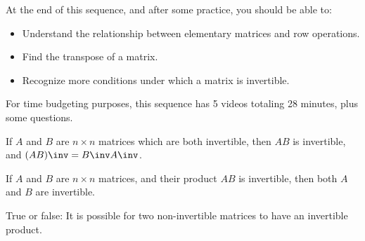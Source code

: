 







At the end of this sequence, and after some practice, you should be able to:

\begin{itemize}
\item Understand the relationship between elementary matrices and row operations.  
\item Find the transpose of a matrix.  
\item Recognize more conditions under which a matrix is invertible.   
\end{itemize}


For time budgeting purposes, this sequence has 5 videos totaling 28 minutes, 
plus some questions.  




\endedxtext

\endedxvertical







{}  
If $A$ and $B$ are $n\times n$ matrices which are both invertible, then $AB$ is invertible, and 
$(AB)\inv = B\inv A\inv$. 


{}  If $A$ and $B$ are $n\times n$ matrices, and their product $AB$ is invertible, then
both $A$ and $B$ are invertible.  

\endedxtext




\endedxvertical







True or false: It is possible for two non-invertible matrices to have an invertible product.  



